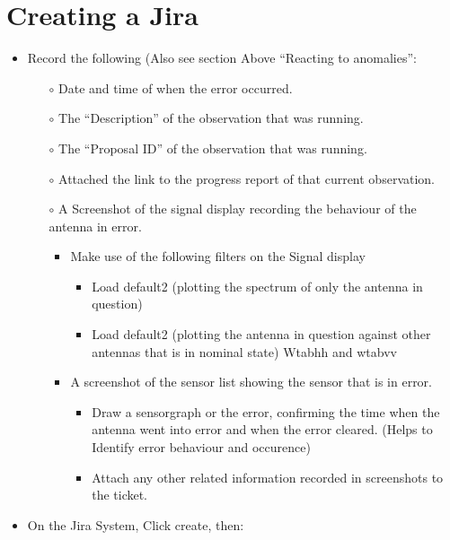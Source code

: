 \section{Creating a Jira}
\begin{itemize}
\item Record the following (Also see section Above “Reacting to anomalies”:

	\begin{itemize} 

\item[$\circ$] Date and time of when the error occurred.
\item[$\circ$] The “Description” of the observation that was running.
\item[$\circ$] The “Proposal ID” of the observation that was running.
\item[$\circ$] Attached the link to the progress report of that current observation.
\item[$\circ$] A Screenshot of the signal display recording the behaviour of the antenna in error.
 \begin{itemize}
 	 
 
\item Make use of the following filters on the Signal display
\begin{itemize}

\item Load default2 (plotting the spectrum of only the antenna in question)
\item Load default2 (plotting the antenna in question against other antennas that is in nominal state)
Wtabhh and wtabvv
\end{itemize}
\item A screenshot of the sensor list showing the sensor that is in error.
\begin{itemize}
\item Draw a sensorgraph or the error, confirming the time when the antenna went into error and when the error cleared. (Helps to Identify error behaviour and occurence)
\item Attach any other related information recorded in screenshots to the ticket.
\end{itemize}
\end{itemize}
\end{itemize} 
\item On the Jira System, Click create, then:
\begin{itemize}


\end{itemize}
\end{itemize}
